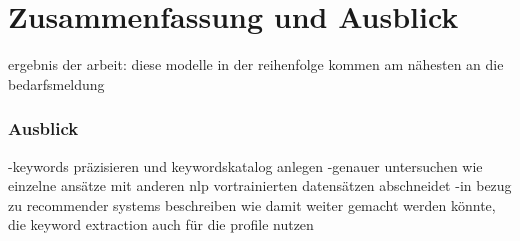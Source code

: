 \chapter{Zusammenfassung und Ausblick}
\label{chap:ergebnisseausblick}

ergebnis der arbeit: diese modelle in der reihenfolge kommen am nähesten an die bedarfsmeldung

\subsection*{Ausblick}
-keywords präzisieren und keywordskatalog anlegen
-genauer untersuchen wie einzelne ansätze mit anderen nlp vortrainierten datensätzen abschneidet
-in bezug zu recommender systems beschreiben wie damit weiter gemacht werden könnte, die keyword extraction auch für die profile nutzen 
\newpage
